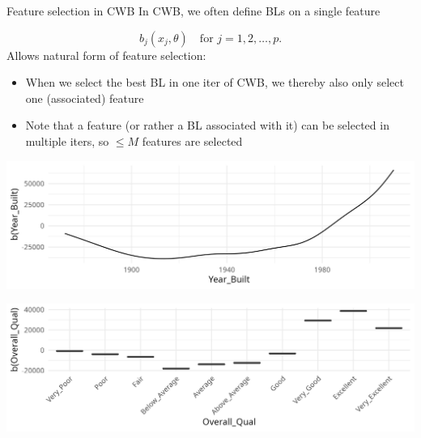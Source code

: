 \documentclass[11pt,compress,t,notes=noshow, xcolor=table]{beamer}
\begin{document}
\begin{vbframe}{Feature selection in CWB}
In CWB, we often define BLs on a single feature

$$
  b_j(x_j, \theta) \quad \text{for } j = 1, 2, \dots, p.
$$
Allows natural form of feature selection:
\begin{itemize}
    \item When we select the best BL in one iter of CWB, we thereby also only select one (associated) feature
    \item Note that a feature (or rather a BL associated with it) can be selected in multiple iters, so $\leq M$ features are selected
\end{itemize}
\vspace{0.5cm}
\begin{center}
\begin{minipage}{0.5\textwidth}
    \includegraphics[width=\textwidth]{figure/compboost-base-learner-spline.png}
\end{minipage}\hfill
\begin{minipage}{0.5\textwidth}
    \includegraphics[width=\textwidth]{figure/compboost-base-learner-ridge.png}
\end{minipage}
\end{center}



\end{vbframe}
\end{document}
